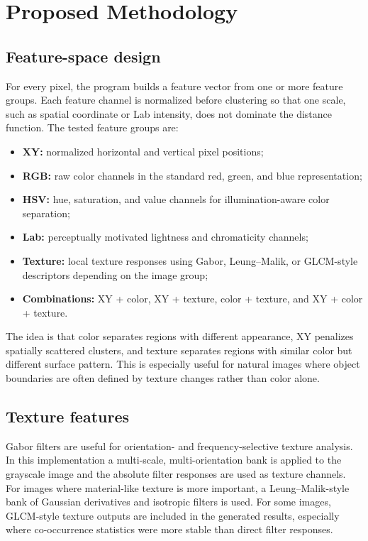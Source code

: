 
\section{Proposed Methodology}
\subsection{Feature-space design}
For every pixel, the program builds a feature vector from one or more feature groups. Each feature channel is normalized before clustering so that one scale, such as spatial coordinate or Lab intensity, does not dominate the distance function. The tested feature groups are:
\begin{itemize}
    \item \textbf{XY:} normalized horizontal and vertical pixel positions;
    \item \textbf{RGB:} raw color channels in the standard red, green, and blue representation;
    \item \textbf{HSV:} hue, saturation, and value channels for illumination-aware color separation;
    \item \textbf{Lab:} perceptually motivated lightness and chromaticity channels;
    \item \textbf{Texture:} local texture responses using Gabor, Leung--Malik, or GLCM-style descriptors depending on the image group;
    \item \textbf{Combinations:} XY + color, XY + texture, color + texture, and XY + color + texture.
\end{itemize}

The idea is that color separates regions with different appearance, XY penalizes spatially scattered clusters, and texture separates regions with similar color but different surface pattern. This is especially useful for natural images where object boundaries are often defined by texture changes rather than color alone.

\subsection{Texture features}
Gabor filters are useful for orientation- and frequency-selective texture analysis. In this implementation a multi-scale, multi-orientation bank is applied to the grayscale image and the absolute filter responses are used as texture channels. For images where material-like texture is more important, a Leung--Malik-style bank of Gaussian derivatives and isotropic filters is used. For some images, GLCM-style texture outputs are included in the generated results, especially where co-occurrence statistics were more stable than direct filter responses.

